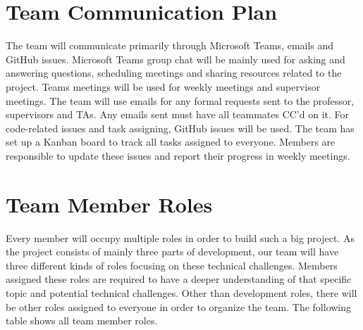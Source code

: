 \documentclass{article}
\begin{document}
\section{Team Communication Plan}
\quad The team will communicate primarily through Microsoft Teams,  emails and GitHub issues. Microsoft Teams group chat will be mainly used for asking and answering questions, scheduling meetings and sharing resources related to the project. Teams meetings will be used for weekly meetings and supervisor meetings. 
\quad The team will use emails for any formal requests sent to the professor, supervisors and TAs. Any emails sent must have all teammates CC'd on it.
\quad For code-related issues and task assigning, GitHub issues will be used. The team has set up a Kanban board to track all tasks assigned to everyone. Members are responsible to update these issues and report their progress in weekly meetings.

\section{Team Member Roles}
\quad Every member will occupy multiple roles in order to build such a big project. As the project consists of mainly three parts of development, our team will have three different kinds of roles focusing on these technical challenges. Members assigned these roles are required to have a deeper understanding of that specific topic and potential technical challenges. Other than development roles, there will be other roles assigned to everyone in order to organize the team. The following table shows all team member roles.
\end{document}
